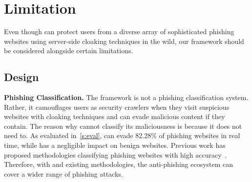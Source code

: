 \section{Limitation}

Even though \spartacus can protect users from a diverse array of sophisticated phishing websites using server-side cloaking techniques in the wild,
our framework should be considered alongside certain limitations.


\subsection{\spartacus Design}

\noindent
\textbf{Phishing Classification.}
The \spartacus framework is not a phishing classification system.
Rather, it camouflages users as security crawlers when they visit suspicious websites with cloaking techniques and can evade malicious content if they contain.
The reason why \spartacus cannot classify its maliciousness is because it does not need to.
As evaluated in~\autoref{s:eval}, \spartacus can evade 82.28\% of phishing websites in real time, while has a negligible impact on benign websites.
Previous work has proposed methodologies classifying phishing websites with high accuracy~\cite{whittaker2010large, lin2021phishpedia}.
Therefore, with \spartacus and existing methodologies, the anti-phishing ecosystem can cover a wider range of phishing attacks.


